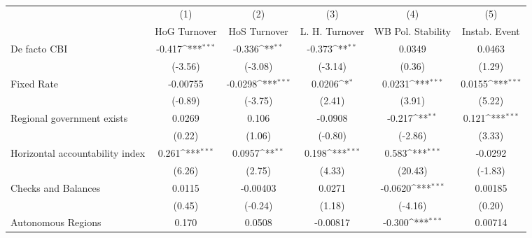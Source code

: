 \begin{table}[htbp]\centering
\def\sym#1{\ifmmode^{#1}\else\(^{#1}\)\fi}
\caption{\label{nccmultIndOLSDF}}
\begin{tabular}{l*{5}{c}}
\toprule
                                        &\multicolumn{1}{c}{(1)}&\multicolumn{1}{c}{(2)}&\multicolumn{1}{c}{(3)}&\multicolumn{1}{c}{(4)}&\multicolumn{1}{c}{(5)}\\
                                        &\multicolumn{1}{c}{HoG Turnover}&\multicolumn{1}{c}{HoS Turnover}&\multicolumn{1}{c}{L. H. Turnover}&\multicolumn{1}{c}{WB Pol. Stability}&\multicolumn{1}{c}{Instab. Event}\\
\midrule
De facto CBI                            &   -0.417\sym{***}&   -0.336\sym{**} &   -0.373\sym{**} &   0.0349         &   0.0463         \\
                                        &  (-3.56)         &  (-3.08)         &  (-3.14)         &   (0.36)         &   (1.29)         \\
\addlinespace
Fixed Rate                              & -0.00755         &  -0.0298\sym{***}&   0.0206\sym{*}  &   0.0231\sym{***}&   0.0155\sym{***}\\
                                        &  (-0.89)         &  (-3.75)         &   (2.41)         &   (3.91)         &   (5.22)         \\
\addlinespace
Regional government exists              &   0.0269         &    0.106         &  -0.0908         &   -0.217\sym{**} &    0.121\sym{***}\\
                                        &   (0.22)         &   (1.06)         &  (-0.80)         &  (-2.86)         &   (3.33)         \\
\addlinespace
Horizontal accountability index         &    0.261\sym{***}&   0.0957\sym{**} &    0.198\sym{***}&    0.583\sym{***}&  -0.0292         \\
                                        &   (6.26)         &   (2.75)         &   (4.33)         &  (20.43)         &  (-1.83)         \\
\addlinespace
Checks and Balances                     &   0.0115         & -0.00403         &   0.0271         &  -0.0620\sym{***}&  0.00185         \\
                                        &   (0.45)         &  (-0.24)         &   (1.18)         &  (-4.16)         &   (0.20)         \\
\addlinespace
Autonomous Regions                      &    0.170         &   0.0508         & -0.00817         &   -0.300\sym{***}&  0.00714         \\

\end{tabular}
\end{table}
